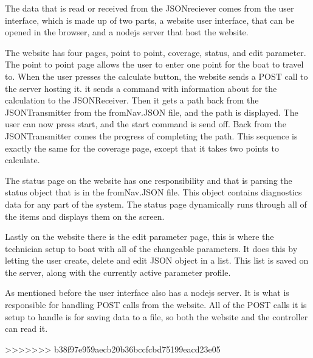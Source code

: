 The data that is read or received from the JSONreciever comes from the user interface, which is made up of two parts, a website user interface, that can be opened in the browser, and a nodejs server that host the website. 

The website has four pages, point to point, coverage, status, and edit parameter. The point to point page allows the user to enter one point for the boat to travel to. When the user presses the calculate button, the website sends a POST call to the server hosting it. it sends a command with information about for the calculation to the JSONReceiver. Then it gets a path back from the JSONTransmitter from the fromNav.JSON file, and the path is displayed. The user can now press start, and the start command is send off. Back from the JSONTransmitter comes the progress of completing the path. This sequence is exactly the same for the coverage page, except that it takes two points to calculate. 

The status page on the website has one responsibility and that is parsing the status object that is in the fromNav.JSON file. This object contains diagnostics data for any part of the system. The status page dynamically runs through all of the items and displays them on the screen.

Lastly on the website there is the edit parameter page, this is where the technician setup to boat with all of the changeable parameters. It does this by letting the user create, delete and edit JSON object in a list. This list is saved on the server, along with the currently active parameter profile. 

As mentioned before the user interface also has a nodejs server\cite{nodejs}. It is what is responsible for handling POST calls from the website. All of the POST calls it is setup to handle is for saving data to a file, so both the website and the controller can read it.



>>>>>>> b38f97e959aecb20b36bccfcbd75199eacd23e05
